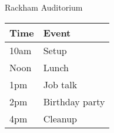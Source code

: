 \documentclass{article}
\newcommand{\event}[2]{
    #1 & #2 \\
}
\begin{document}
\rssheader[1in]

\fontsize{32pt}{36pt}
\selectfont
\begin{center}
Rackham Auditorium
\end{center}

\fontsize{14pt}{16pt}
\selectfont

\begin{center}
    \begin{tabularx}{.8\textwidth}{lX}
    \toprule[.2ex]
        \textbf{Time}\hspace{1in} & \textbf{Event}\hfill \\
    \midrule
        \event{10am}{Setup}
        \event{Noon}{Lunch}
        \event{1pm}{Job talk}
        \event{2pm}{Birthday party}
        \event{4pm}{Cleanup}
    \bottomrule[.2ex]
    \end{tabularx}
\end{center}

\vfill
\end{document}
